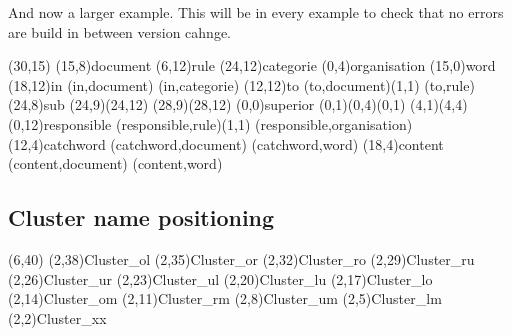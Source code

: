 \documentclass[a4paper,11pt]{article}
\begin{document}
And now a larger example. This will be in every example to check that 
no errors are build in between version cahnge.

\setlength{\hermunit}{.5cm}
\begin{schema}(30,15)
\entity(15,8){document}
%
\entity(6,12){rule}
%
\entity(24,12){categorie}
%
\entity(0,4){organisation}
%
\entity(15,0){word}
%
\relation(18,12){in}
\connection(in,document){}
\connection(in,categorie){}
%
\relation(12,12){to}
\connection(to,document){(1,1)}
\connection(to,rule){}
%
\relation(24,8){sub}
\connection*(24,9)(24,12){}
\connection*(28,9)(28,12){}
%
\relation(0,0){superior}
\connection*(0,1)(0,4){(0,1)}
\connection*(4,1)(4,4){}
%
\relation(0,12){responsible}
\connection(responsible,rule){(1,1)}
\connection(responsible,organisation){}
%
\relation(12,4){catchword}
\connection(catchword,document){}
\connection(catchword,word){}
%
\relation(18,4){content}
\connection(content,document){}
\connection(content,word){}
\end{schema}

\subsection{Cluster name positioning}

\begin{schema}(6,40)
\cluster*(2,38){Cluster\_ol}
\cluster*(2,35){Cluster\_or}
\cluster*(2,32){Cluster\_ro}
\cluster*(2,29){Cluster\_ru}
\cluster*(2,26){Cluster\_ur}
\cluster*(2,23){Cluster\_ul}
\cluster*(2,20){Cluster\_lu}
\cluster*(2,17){Cluster\_lo}
\cluster*(2,14){Cluster\_om}
\cluster*(2,11){Cluster\_rm}
\cluster*(2,8){Cluster\_um}
\cluster*(2,5){Cluster\_lm}
\cluster*(2,2){Cluster\_xx}
\end{schema}
\end{document}
